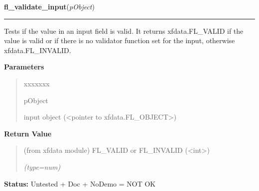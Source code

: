 \hspace{.8\funcindent}\begin{boxedminipage}{\funcwidth}

    \raggedright \textbf{fl\_validate\_input}(\textit{pObject})

    \vspace{-1.5ex}

    \rule{\textwidth}{0.5\fboxrule}
\setlength{\parskip}{2ex}
    Tests if the value in an input field is valid. It returns 
    xfdata.FL\_VALID if the value is valid or if there is no validator 
    function set for the input, otherwise xfdata.FL\_INVALID.

\setlength{\parskip}{1ex}
      \textbf{Parameters}
      \vspace{-1ex}

      \begin{quote}
        \begin{Ventry}{xxxxxxx}

          \item[pObject]

          input object ({\textless}pointer to 
          xfdata.FL\_OBJECT{\textgreater})

        \end{Ventry}

      \end{quote}

      \textbf{Return Value}
    \vspace{-1ex}

      \begin{quote}
      (from xfdata module) FL\_VALID or FL\_INVALID 
      ({\textless}int{\textgreater})

      {\it (type=num)}

      \end{quote}

\textbf{Status:} Untested + Doc + NoDemo = NOT OK



    \end{boxedminipage}

    \label{xformslib:library:fl_set_object_shortcut}

    \vspace{0.5ex}

